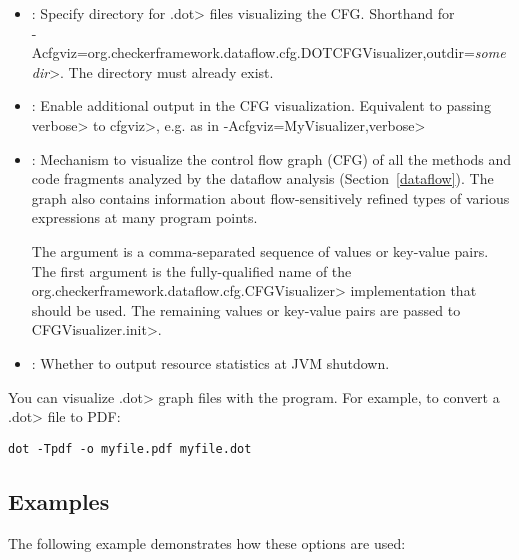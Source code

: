 \begin{itemize}

\item {}:
  Specify directory for \<.dot> files visualizing the CFG\@.
  Shorthand for\\
  \<-Acfgviz=org.checkerframework.dataflow.cfg.DOTCFGVisualizer,outdir=\emph{somedir}>.
  The directory must already exist.

\item {}:
  Enable additional output in the CFG visualization.
  Equivalent to passing \<verbose> to \<cfgviz>, e.g. as in
  \<-Acfgviz=MyVisualizer,verbose>

\item {}:
  Mechanism to visualize the control flow graph (CFG) of
  all the methods and code fragments
  analyzed by the dataflow analysis (Section~\ref{dataflow}).
  The graph also contains information about flow-sensitively refined
  types of various expressions at many program points.

  The argument is a comma-separated sequence of values or key-value pairs.
  The first argument is the fully-qualified name of the
  \<org.checkerframework.dataflow.cfg.CFGVisualizer> implementation
  that should be used. The remaining values or key-value pairs are
  passed to \<CFGVisualizer.init>.

\item {}:
  Whether to output resource statistics at JVM shutdown.

\end{itemize}

You can visualize \<.dot> graph files with the  program.  For
example, to convert a \<.dot> file to PDF:

\begin{Verbatim}
dot -Tpdf -o myfile.pdf myfile.dot
\end{Verbatim}


\subsection{Examples\label{debugging-options-examples}}

The following example demonstrates how these options are used:

